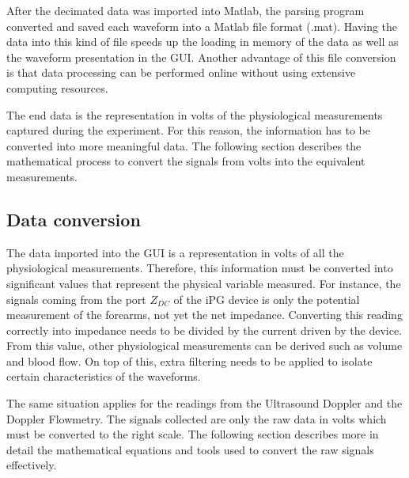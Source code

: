 After the decimated data was imported into Matlab, the parsing program converted and saved each waveform into a Matlab file format (.mat). Having the data into this kind of file speeds up the loading in memory of the data as well as the waveform presentation in the GUI. Another advantage of this file conversion is that data processing can be performed online without using extensive computing resources. 

The end data is the representation in volts of the physiological measurements captured during the experiment. For this reason, the information has to be converted into more meaningful data. The following section describes the mathematical process to convert the signals from volts into the equivalent measurements.

\subsection{Data conversion}
\label{section procedure 2.1}
The data imported into the GUI is a representation in volts of all the physiological measurements. Therefore, this information must be converted into significant values that represent the physical variable measured. For instance, the signals coming from the port $Z_{DC}$ of the iPG device is only the potential measurement of the forearms, not yet the net impedance. Converting this reading correctly into impedance needs to be divided by the current driven by the device. From this value, other physiological measurements can be derived such as volume and blood flow. On top of this, extra filtering needs to be applied to isolate certain characteristics of the waveforms. 

The same situation applies for the readings from the Ultrasound Doppler and the Doppler Flowmetry. The signals collected are only the raw data in volts which must be converted to the right scale. The following section describes more in detail the mathematical equations and tools used to convert the raw signals effectively.  

